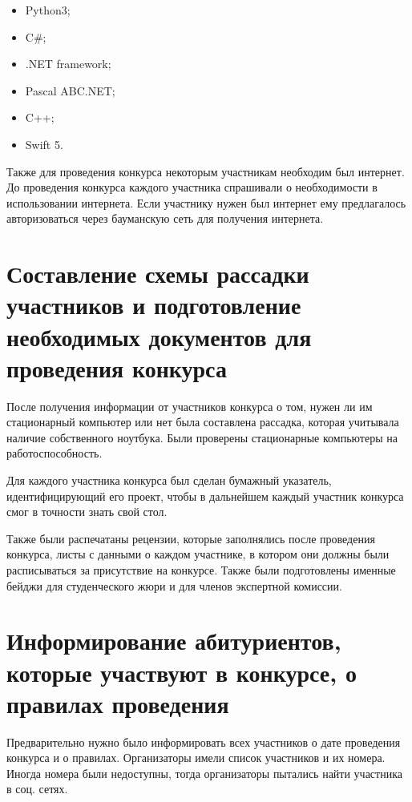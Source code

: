 \documentclass[12pt]{report}
\begin{document}
\begin{itemize}
	\item Python3;
	\item C\#;
	\item .NET framework;
	\item Pascal ABC.NET;
	\item C++;
	\item Swift 5.
\end{itemize}

Также для проведения конкурса некоторым участникам необходим был интернет.
До проведения конкурса каждого участника спрашивали о необходимости в использовании интернета.
Если участнику нужен был интернет ему предлагалось авторизоваться через бауманскую сеть для получения интернета.

\section{Составление схемы рассадки участников и подготовление необходимых документов для проведения конкурса}

После получения информации от участников конкурса о том, нужен ли им стационарный компьютер или нет
была составлена рассадка, которая учитывала наличие собственного ноутбука. 
Были проверены стационарные компьютеры на работоспособность.



Для каждого участника конкурса был сделан бумажный указатель, идентифицирующий его проект, чтобы 
в дальнейшем каждый участник конкурса смог в точности знать свой стол. 

Также были распечатаны рецензии, которые заполнялись после проведения конкурса, 
листы с данными о каждом участнике, в котором они должны были расписываться за присутствие на конкурсе. 
Также были подготовлены именные бейджи для студенческого жюри и для членов экспертной комиссии. 

\section{Информирование абитуриентов, которые участвуют в конкурсе, о правилах проведения}

Предварительно нужно было информировать всех участников о дате проведения конкурса 
и о правилах. Организаторы имели список участников и их номера. 
Иногда номера были недоступны, тогда организаторы пытались найти участника в соц. сетях.
\end{document}
